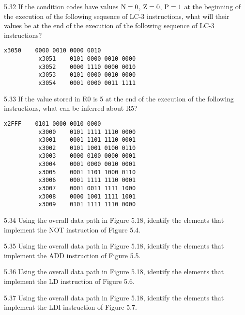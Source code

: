 \documentclass{patt}
\begin{document}
\begin{exercises}
\enlargethispage{-2\baselineskip}

\item[5.32] If the condition codes have values ${\rm N}=0$, ${\rm
  Z}=0$, ${\rm P}=1$ at the beginning of the execution of the
  following sequence of LC-3 instructions, what will their values 
  be at the end of the execution of the following sequence of LC-3 
  instructions?

{\color{seventyblack}
\begin{Verbatim}[fontsize=\fontsize{9}{14}\selectfont]
          x3050    0000 0010 0000 0010
          x3051    0101 0000 0010 0000
          x3052    0000 1110 0000 0010
          x3053    0101 0000 0010 0000
          x3054    0001 0000 0011 1111
\end{Verbatim}

}

\item[5.33] If the value stored in R0 is 5 at the end of the execution
  of the following instructions, what can be inferred about R5?

{\color{seventyblack}
\begin{Verbatim}[fontsize=\fontsize{9}{13}\selectfont]
          x2FFF    0101 0000 0010 0000
          x3000    0101 1111 1110 0000
          x3001    0001 1101 1110 0001
          x3002    0101 1001 0100 0110
          x3003    0000 0100 0000 0001
          x3004    0001 0000 0010 0001
          x3005    0001 1101 1000 0110
          x3006    0001 1111 1110 0001
          x3007    0001 0011 1111 1000
          x3008    0000 1001 1111 1001
          x3009    0101 1111 1110 0000
\end{Verbatim}

}

\item[5.34] Using the overall data path in Figure 5.18, identify the
  elements that implement the NOT instruction of Figure 5.4.

\item[5.35] Using the overall data path in Figure 5.18, identify the
  elements that implement the ADD instruction of Figure 5.5.

\item[5.36] Using the overall data path in Figure 5.18, identify the
  elements that implement the LD instruction of Figure 5.6.
\normalcolor
\color{black}

\item[5.37] Using the overall data path in Figure 5.18, identify the
  elements that implement the LDI instruction of Figure 5.7.


\end{exercises}
\end{document}
